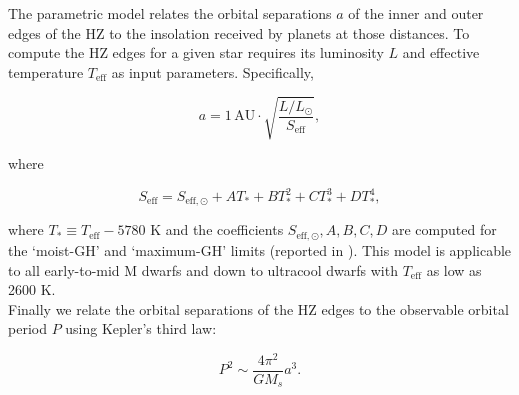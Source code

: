 The parametric model \citep{kopparapu13} relates the orbital separations 
$a$ of the inner and outer edges of the HZ to the insolation received by planets 
at those distances. To compute the HZ edges for a given star requires its 
luminosity $L$ and effective temperature $T_{\mathrm{eff}}$ 
as input parameters. Specifically,

\begin{equation}
a = 1 \mathrm{\hspace{2pt} AU} \cdot \sqrt{\frac{L/L_{\odot}}{S_{\mathrm{eff}}}},
\end{equation}

\noindent where

\begin{equation}
S_{\mathrm{eff}} = S_{\mathrm{eff},\odot} + AT_* + BT_*^2 + CT_*^3 + DT_*^4,
\end{equation}

\noindent where $T_* \equiv T_{\mathrm{eff}}-5780$ K and the coefficients 
$S_{\mathrm{eff},\odot},A,B,C,D$ are computed for the `moist-GH' and `maximum-GH' 
limits (reported in \cite{kopparapu13}). This model is applicable to all 
early-to-mid M dwarfs and down to ultracool dwarfs with $T_{\mathrm{eff}}$ as 
low as 2600 K. \\

Finally we relate the orbital separations of the HZ edges to the observable 
orbital period $P$ using Kepler's third law:

\begin{equation}
P^2 \sim \frac{4 \pi^2}{G M_s} a^3.
\label{eq:keplersthird}
\end{equation}
\fi

